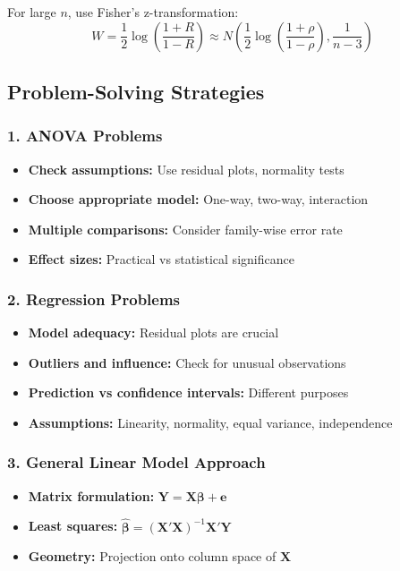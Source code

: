 For large $n$, use Fisher's z-transformation:
\[
W = \frac{1}{2}\log\left(\frac{1+R}{1-R}\right) \approx N\left(\frac{1}{2}\log\left(\frac{1+\rho}{1-\rho}\right), \frac{1}{n-3}\right)
\]

\subsection{Problem-Solving Strategies}

\subsubsection{1. ANOVA Problems}

\begin{itemize}
	\item \textbf{Check assumptions:} Use residual plots, normality tests
	\item \textbf{Choose appropriate model:} One-way, two-way, interaction
	\item \textbf{Multiple comparisons:} Consider family-wise error rate
	\item \textbf{Effect sizes:} Practical vs statistical significance
\end{itemize}

\subsubsection{2. Regression Problems}

\begin{itemize}
	\item \textbf{Model adequacy:} Residual plots are crucial
	\item \textbf{Outliers and influence:} Check for unusual observations
	\item \textbf{Prediction vs confidence intervals:} Different purposes
	\item \textbf{Assumptions:} Linearity, normality, equal variance, independence
\end{itemize}

\subsubsection{3. General Linear Model Approach}

\begin{itemize}
	\item \textbf{Matrix formulation:} $\mathbf{Y} = \mathbf{X}\boldsymbol{\beta} + \mathbf{e}$
	\item \textbf{Least squares:} $\hat{\boldsymbol{\beta}} = (\mathbf{X}'\mathbf{X})^{-1}\mathbf{X}'\mathbf{Y}$
	\item \textbf{Geometry:} Projection onto column space of $\mathbf{X}$
\end{itemize}

